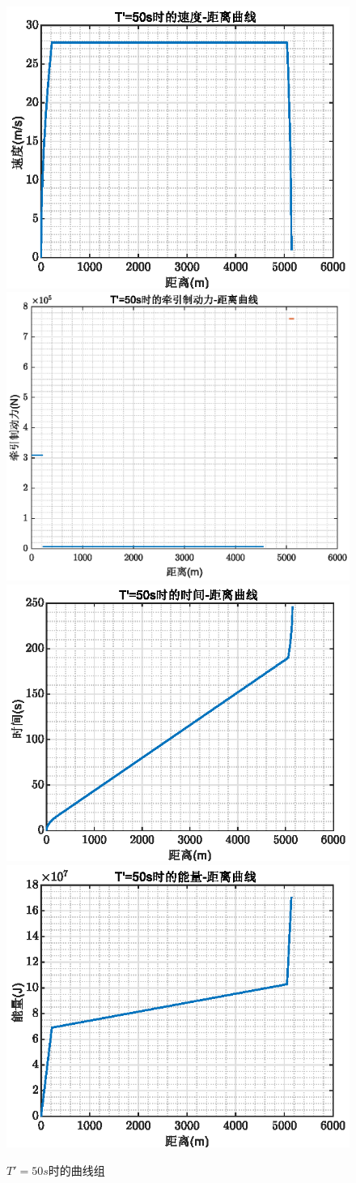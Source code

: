 \documentclass[12pt,a4paper]{nmmcm}
\begin{document}
\begin{figure}[H]
\centering
\includegraphics[width=.49\textwidth,height=0.3\textwidth]{figures/50a.eps}
\includegraphics[width=.49\textwidth,height=0.3\textwidth]{figures/50b.eps}
\includegraphics[width=.49\textwidth,height=0.3\textwidth]{figures/50c.eps}
\includegraphics[width=.49\textwidth,height=0.3\textwidth]{figures/50d.eps}
\caption{\song\wuhao $T'=50s$时的曲线组}
\end{figure}
\end{document}
